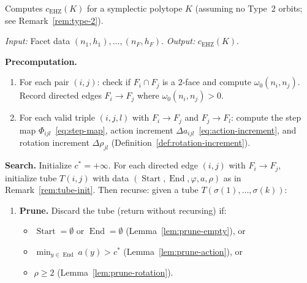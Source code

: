 \begin{algorithm}\label{alg:tube}
Computes $c_{\mathrm{EHZ}}(K)$ for a symplectic polytope $K$
(assuming no Type~2 orbits; see Remark~\ref{rem:type-2}).

\smallskip\noindent
\emph{Input:} Facet data $(n_1, h_1), \ldots, (n_F, h_F)$.
\quad
\emph{Output:} $c_{\mathrm{EHZ}}(K)$.

\smallskip\noindent
\textbf{Precomputation.}
\begin{enumerate}
\item For each pair $(i,j)$: check if $F_i \cap F_j$ is a $2$-face
  and compute $\omega_0(n_i, n_j)$. Record directed edges $F_i \to F_j$ where $\omega_0(n_i, n_j) > 0$.
\item For each valid triple $(i,j,l)$ with $F_i \to F_j$ and $F_j \to F_l$:
  compute the step map $\Phi_{ijl}$~\eqref{eq:step-map},
  action increment $\Delta a_{ijl}$~\eqref{eq:action-increment},
  and rotation increment $\Delta\rho_{jl}$
  (Definition~\ref{def:rotation-increment}).
\end{enumerate}

\smallskip\noindent
\textbf{Search.}
Initialize $c^* = +\infty$.
For each directed edge $(i, j)$ with $F_i \to F_j$,
initialize tube $T(i, j)$ with data
$(\operatorname{Start}, \operatorname{End}, \varphi, a, \rho)$
as in Remark~\ref{rem:tube-init}.
Then recurse: given a tube $T(\sigma(1), \ldots, \sigma(k))$:

\begin{enumerate}
\item \textbf{Prune.} Discard the tube (return without recursing) if:
  \begin{itemize}
  \item $\operatorname{Start} = \emptyset$ or $\operatorname{End} = \emptyset$
    (Lemma~\ref{lem:prune-empty}), or
  \item $\min_{y \in \operatorname{End}} a(y) > c^*$
    (Lemma~\ref{lem:prune-action}), or
  \item $\rho \geq 2$
    (Lemma~\ref{lem:prune-rotation}).
  \end{itemize}


\end{enumerate}
\end{algorithm}
